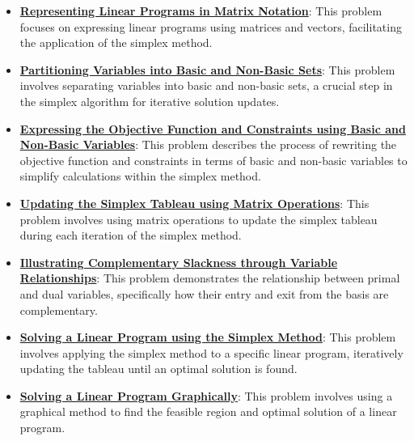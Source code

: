 \documentclass{article}%
\begin{document}
\begin{itemize}[leftmargin=*]%
\item \href{https://www.math.purdue.edu/~yipn/421//2024-09-24-SimplexMatrix.pdf#page=1}{\textbf{Representing Linear Programs in Matrix Notation}}: This problem focuses on expressing linear programs using matrices and vectors, facilitating the application of the simplex method.%
\item \href{https://www.math.purdue.edu/~yipn/421//2024-09-24-SimplexMatrix.pdf#page=4}{\textbf{Partitioning Variables into Basic and Non{-}Basic Sets}}: This problem involves separating variables into basic and non-basic sets, a crucial step in the simplex algorithm for iterative solution updates.%
\item \href{https://www.math.purdue.edu/~yipn/421//2024-09-24-SimplexMatrix.pdf#page=8}{\textbf{Expressing the Objective Function and Constraints using Basic and Non{-}Basic Variables}}: This problem describes the process of rewriting the objective function and constraints in terms of basic and non-basic variables to simplify calculations within the simplex method.%
\item \href{https://www.math.purdue.edu/~yipn/421//2024-09-24-SimplexMatrix.pdf#page=10}{\textbf{Updating the Simplex Tableau using Matrix Operations}}: This problem involves using matrix operations to update the simplex tableau during each iteration of the simplex method.%
\item \href{https://www.math.purdue.edu/~yipn/421//2024-09-24-SimplexMatrix.pdf#page=14}{\textbf{Illustrating Complementary Slackness through Variable Relationships}}: This problem demonstrates the relationship between primal and dual variables, specifically how their entry and exit from the basis are complementary.%
\item \href{https://www.math.purdue.edu/~yipn/421//2024-09-24-SimplexMatrix.pdf#page=15}{\textbf{Solving a Linear Program using the Simplex Method}}: This problem involves applying the simplex method to a specific linear program, iteratively updating the tableau until an optimal solution is found.%
\item \href{https://www.math.purdue.edu/~yipn/421//2024-09-24-SimplexMatrix.pdf#page=21}{\textbf{Solving a Linear Program Graphically}}: This problem involves using a graphical method to find the feasible region and optimal solution of a linear program.%
\end{itemize}%
\end{document}
